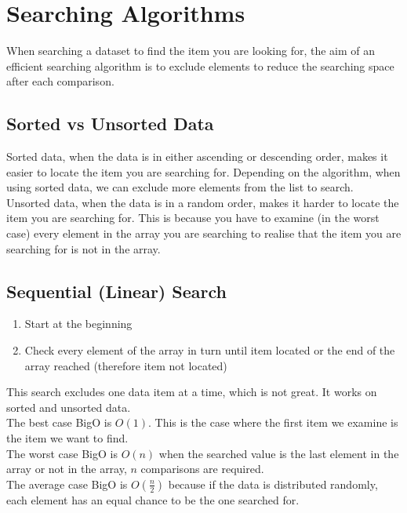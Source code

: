 
\section{Searching Algorithms}
When searching a dataset to find the item you are looking for, the aim of an efficient searching algorithm is to exclude elements to reduce the searching space after each comparison.

\subsection{Sorted vs Unsorted Data}
Sorted data, when the data is in either ascending or descending order, makes it easier to locate the item you are searching for. Depending on the algorithm, when using sorted data, we can exclude more elements from the list to search.\\

Unsorted data, when the data is in a random order, makes it harder to locate the item you are searching for. This is because you have to examine (in the worst case) every element in the array you are searching to realise that the item you are searching for is not in the array.

\subsection{Sequential (Linear) Search}
\begin{enumerate}
    \item Start at the beginning
    \item Check every element of the array in turn until item located or the end of the array reached (therefore item not located)
\end{enumerate}
This search excludes one data item at a time, which is not great. It works on sorted and unsorted data.\\

The best case BigO is $O(1)$. This is the case where the first item we examine is the item we want to find.\\

The worst case BigO is $O(n)$ when the searched value is the last element in the array or not in the array, $n$ comparisons are required.\\

The average case BigO is $O(\frac{n}{2})$ because if the data is distributed randomly, each element has an equal chance to be the one searched for.\\

